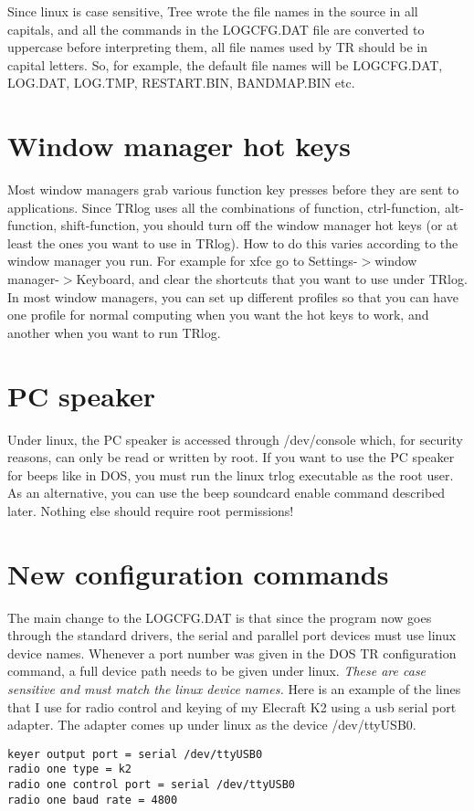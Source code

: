 \documentclass[12pt]{article}
\begin{document}
Since linux is case sensitive, Tree wrote the file names in the
source in all capitals, and all the commands in the LOGCFG.DAT file
are converted to uppercase before interpreting them, all file names used
by TR should be in capital letters. So,
for example, the default file names will be
LOGCFG.DAT, LOG.DAT, LOG.TMP, RESTART.BIN, BANDMAP.BIN etc.


\section{Window manager hot keys}
Most window managers
grab various function key presses before they
are sent to applications. Since TRlog uses all the combinations of
function, ctrl-function, alt-function, shift-function, you should turn
off the window manager hot keys (or at least the ones you want to use
in TRlog). How to do this varies according to the window manager you run.
For example for xfce go to Settings-$>$window manager-$>$Keyboard, and clear
the shortcuts that you want to use under TRlog. In most window managers,
you can set up different profiles so that you can have one profile for
normal computing when you want the hot keys to work, and another when you
want to run TRlog.

\section{PC speaker}
Under linux, the PC speaker
is accessed through /dev/console which, for
security reasons, can only be read or written by root. If you
want to use the PC speaker for beeps like in DOS, you must run the linux trlog 
executable as the root user.
As an alternative, you can use the beep soundcard enable command described
later. Nothing else should require root permissions!

\section{New configuration commands}
The main change to the LOGCFG.DAT is that since the program now goes through
the standard drivers, the serial
and parallel port devices must use linux
device names. Whenever a port number was given in the DOS TR configuration
command, a full device path needs to be given under linux. {\em These
are case sensitive and must match the linux device names.}
Here is an example of the lines that I use for radio control and keying
of my Elecraft K2 using a usb serial port adapter. The adapter comes
up under linux as the device /dev/ttyUSB0.
\begin{verbatim}
keyer output port = serial /dev/ttyUSB0
radio one type = k2
radio one control port = serial /dev/ttyUSB0
radio one baud rate = 4800
\end{verbatim}
\end{document}
